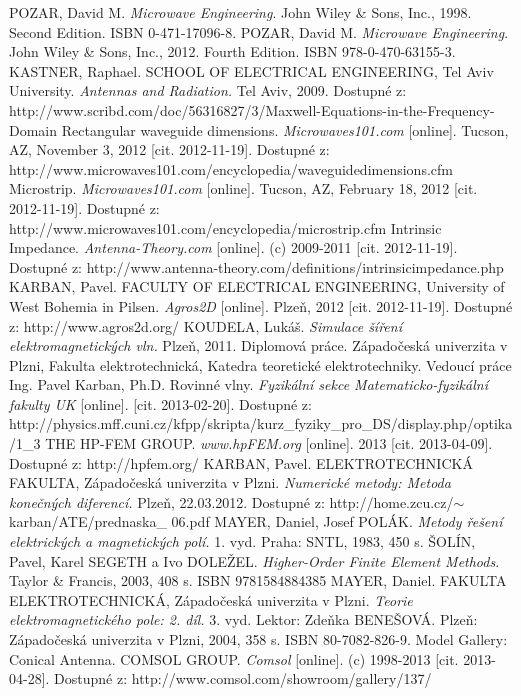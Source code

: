 \documentclass[12pt,a4paper,oneside]{article}
\numberwithin{equation}{section} %
\numberwithin{figure}{section} %
\numberwithin{table}{section} %
\begin{document}
\newpage
{} %
\begin{thebibliography}{10}

 POZAR, David M. \textit{Microwave Engineering}. John Wiley \& Sons, Inc., 1998. Second Edition. ISBN 0-471-17096-8.
 POZAR, David M. \textit{Microwave Engineering}. John Wiley \& Sons, Inc., 2012. Fourth Edition. ISBN 978-0-470-63155-3.
 KASTNER, Raphael. SCHOOL OF ELECTRICAL ENGINEERING, Tel Aviv University. \textit{Antennas and Radiation.} Tel Aviv, 2009. Dostupné z: http://www.scribd.com/doc/56316827/3/Maxwell-Equations-in-the-Frequency-Domain
 Rectangular waveguide dimensions. \textit{Microwaves101.com} [online]. Tucson, AZ, November 3, 2012 [cit. 2012-11-19]. Dostupné z: http://www.microwaves101.com/encyclopedia/waveguidedimensions.cfm
 Microstrip. \textit{Microwaves101.com} [online]. Tucson, AZ, February 18, 2012 [cit. 2012-11-19]. Dostupné z: http://www.microwaves101.com/encyclopedia/microstrip.cfm
 Intrinsic Impedance. \textit{Antenna-Theory.com} [online]. (c) 2009-2011 [cit. 2012-11-19]. Dostupné z: http://www.antenna-theory.com/definitions/intrinsicimpedance.php
 KARBAN, Pavel. FACULTY OF ELECTRICAL ENGINEERING, University of West Bohemia in Pilsen. \textit{Agros2D} [online]. Plzeň, 2012 [cit. 2012-11-19]. Dostupné z: http://www.agros2d.org/
 KOUDELA, Lukáš. \textit{Simulace šíření elektromagnetických vln.} Plzeň, 2011. Diplomová práce. Západočeská univerzita v Plzni, Fakulta elektrotechnická, Katedra teoretické elektrotechniky. Vedoucí práce Ing. Pavel Karban, Ph.D.
 Rovinné vlny. \textit{Fyzikální sekce Matematicko-fyzikální fakulty UK} [online]. [cit. 2013-02-20]. Dostupné z: http://physics.mff.cuni.cz/kfpp/skripta/kurz\_fyziky\_pro\_DS/display.php/optika/1\_3
 THE HP-FEM GROUP. \textit{www.hpFEM.org} [online]. 2013 [cit. 2013-04-09]. Dostupné z: http://hpfem.org/
 KARBAN, Pavel. ELEKTROTECHNICKÁ FAKULTA, Západočeská univerzita v Plzni. \textit{Numerické metody: Metoda konečných diferencí.} Plzeň, 22.03.2012. Dostupné z: http://home.zcu.cz/$\sim$karban/ATE/prednaska\_ 06.pdf
 MAYER, Daniel, Josef POLÁK. \textit{Metody řešení elektrických a magnetických polí.} 1. vyd. Praha: SNTL, 1983, 450 s.
 ŠOLÍN, Pavel, Karel SEGETH a Ivo DOLEŽEL. \textit{Higher-Order Finite Element Methods}. Taylor \& Francis, 2003, 408 s. ISBN 9781584884385
 MAYER, Daniel. FAKULTA ELEKTROTECHNICKÁ, Západočeská univerzita v Plzni. \textit{Teorie elektromagnetického pole: 2. díl.} 3. vyd. Lektor: Zdeňka BENEŠOVÁ. Plzeň: Západočeská univerzita v Plzni, 2004, 358 s. ISBN 80-7082-826-9.
 Model Gallery: Conical Antenna. COMSOL GROUP. \textit{Comsol} [online]. (c) 1998-2013 [cit. 2013-04-28]. Dostupné z: http://www.comsol.com/showroom/gallery/137/


\end{thebibliography}
\end{document}
